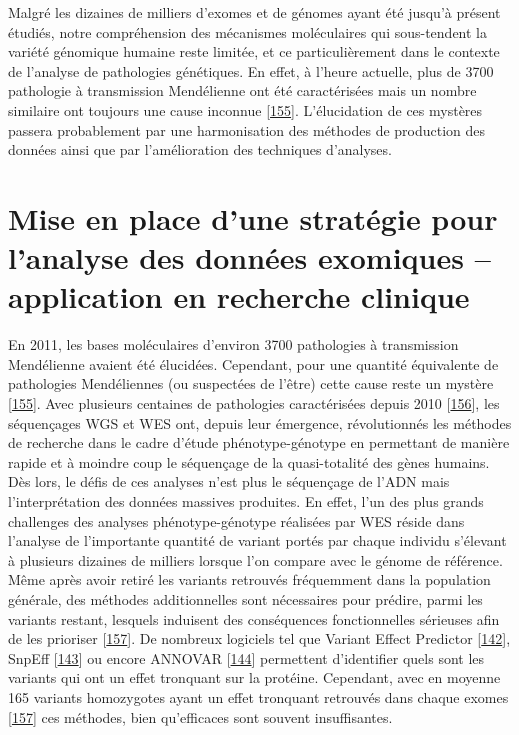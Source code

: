\documentclass[12pt,twoside]{reedthesis}
\theoremstyle{definition}
\theoremstyle{definition}
\theoremstyle{remark}
\begin{document}
  Malgré les dizaines de milliers d'exomes et de génomes ayant été jusqu'à
  présent étudiés, notre compréhension des mécanismes moléculaires qui
  sous-tendent la variété génomique humaine reste limitée, et ce
  particulièrement dans le contexte de l'analyse de pathologies
  génétiques. En effet, à l'heure actuelle, plus de 3700 pathologie à
  transmission Mendélienne ont été caractérisées mais un nombre similaire
  ont toujours une cause inconnue
  {[}\protect\hyperlink{ref-Amberger2011}{155}{]}. L'élucidation de ces
  mystères passera probablement par une harmonisation des méthodes de
  production des données ainsi que par l'amélioration des techniques
  d'analyses.
  
  \chapter{Mise en place d'une stratégie pour l'analyse des données
  exomiques -- application en recherche
  clinique}\label{mise-en-place-dune-strategie-pour-lanalyse-des-donnees-exomiques-application-en-recherche-clinique}
  
  \newpage
  
  En 2011, les bases moléculaires d'environ 3700 pathologies à
  transmission Mendélienne avaient été élucidées. Cependant, pour une
  quantité équivalente de pathologies Mendéliennes (ou suspectées de
  l'être) cette cause reste un mystère
  {[}\protect\hyperlink{ref-Amberger2011}{155}{]}. Avec plusieurs
  centaines de pathologies caractérisées depuis 2010
  {[}\protect\hyperlink{ref-Ng}{156}{]}, les séquençages WGS et WES ont,
  depuis leur émergence, révolutionnés les méthodes de recherche dans le
  cadre d'étude phénotype-génotype en permettant de manière rapide et à
  moindre coup le séquençage de la quasi-totalité des gènes humains. Dès
  lors, le défis de ces analyses n'est plus le séquençage de l'ADN mais
  l'interprétation des données massives produites. En effet, l'un des plus
  grands challenges des analyses phénotype-génotype réalisées par WES
  réside dans l'analyse de l'importante quantité de variant portés par
  chaque individu s'élevant à plusieurs dizaines de milliers lorsque l'on
  compare avec le génome de référence. Même après avoir retiré les
  variants retrouvés fréquemment dans la population générale, des méthodes
  additionnelles sont nécessaires pour prédire, parmi les variants
  restant, lesquels induisent des conséquences fonctionnelles sérieuses
  afin de les prioriser {[}\protect\hyperlink{ref-Pelak2010}{157}{]}. De
  nombreux logiciels tel que Variant Effect Predictor
  {[}\protect\hyperlink{ref-McLaren2016}{142}{]}, SnpEff
  {[}\protect\hyperlink{ref-Cingolani2012}{143}{]} ou encore ANNOVAR
  {[}\protect\hyperlink{ref-Wang2010}{144}{]} permettent d'identifier
  quels sont les variants qui ont un effet tronquant sur la protéine.
  Cependant, avec en moyenne 165 variants homozygotes ayant un effet
  tronquant retrouvés dans chaque exomes
  {[}\protect\hyperlink{ref-Pelak2010}{157}{]} ces méthodes, bien
  qu'efficaces sont souvent insuffisantes.
  
\end{document}

